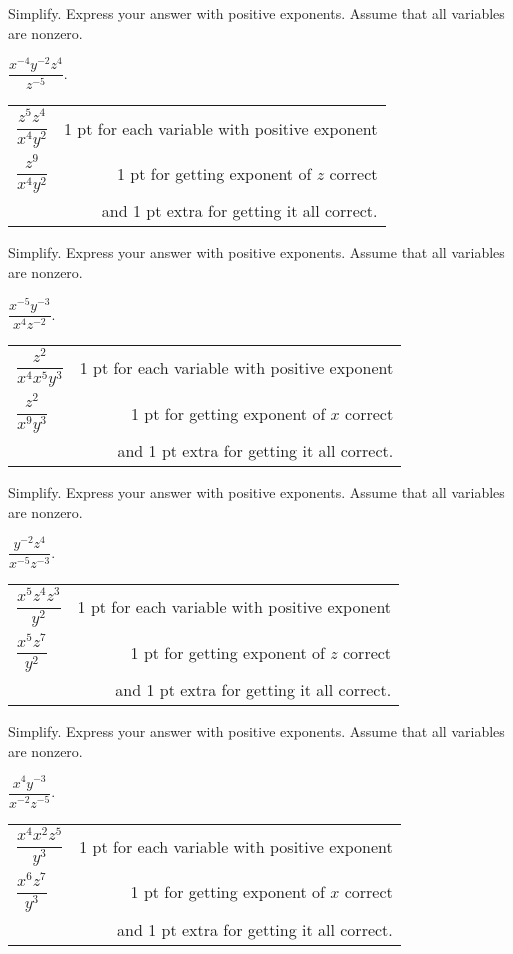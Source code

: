 {
	Simplify. Express your answer with positive exponents. Assume that all variables are nonzero. 
	
	\bigskip \noindent $\dfrac{x^{-4}y^{-2}z^4}{z^{-5}}$.
}
{
	\begin{tabular}{l r}
	$\dfrac{z^5z^4}{x^4y^2}$ & 1 pt for each variable with positive exponent\\
	$\dfrac{z^9}{x^4y^2}$ & 1 pt for getting exponent of $z$ correct\\
	& and 1 pt extra for getting it all correct.
	\end{tabular}
}

{
	Simplify. Express your answer with positive exponents. Assume that all variables are nonzero. 
	
	\bigskip \noindent $\dfrac{x^{-5}y^{-3}}{x^4z^{-2}}$.
}
{
	\begin{tabular}{l r}
	$\dfrac{z^2}{x^4x^5y^3}$ & 1 pt for each variable with positive exponent\\
	$\dfrac{z^2}{x^9y^3}$ & 1 pt for getting exponent of $x$ correct\\
	& and 1 pt extra for getting it all correct.
	\end{tabular}
}

{
	Simplify. Express your answer with positive exponents. Assume that all variables are nonzero. 
	
	\bigskip \noindent $\dfrac{y^{-2}z^4}{x^{-5}z^{-3}}$.
}
{
	\begin{tabular}{l r}
	$\dfrac{x^5z^4z^3}{y^2}$ & 1 pt for each variable with positive exponent\\
	$\dfrac{x^5z^7}{y^2}$ & 1 pt for getting exponent of $z$ correct\\
	& and 1 pt extra for getting it all correct.
	\end{tabular}
}

{
	Simplify. Express your answer with positive exponents. Assume that all variables are nonzero. 
	
	\bigskip \noindent $\dfrac{x^{4}y^{-3}}{x^{-2}z^{-5}}$.
}
{
	\begin{tabular}{l r}
	$\dfrac{x^4x^2z^5}{y^3}$ & 1 pt for each variable with positive exponent\\
	$\dfrac{x^6z^7}{y^3}$ & 1 pt for getting exponent of $x$ correct\\
	& and 1 pt extra for getting it all correct.
	\end{tabular}
}
